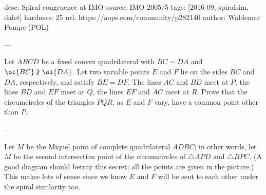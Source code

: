 desc: Spiral congruence at IMO
source: IMO 2005/5
tags: [2016-09, spiralsim, dalet]
hardness: 25
url: https://aops.com/community/p282140
author: Waldemar Pompe (POL)

---

Let $ABCD$ be a fixed convex quadrilateral
with $BC=DA$ and $\ol{BC} \nparallel \ol{DA}$.
Let two variable points $E$ and $F$ lie on the
sides $BC$ and $DA$, respectively, and satisfy $BE=DF$.
The lines $AC$ and $BD$ meet at $P$,
the lines $BD$ and $EF$ meet at $Q$,
the lines $EF$ and $AC$ meet at $R$.
Prove that the circumcircles of the triangles $PQR$,
as $E$ and $F$ vary, have a common point other than $P$.

---

Let $M$ be the Miquel point of complete quadrilateral $ADBC$;
in other words, let $M$ be the second intersection point
of the circumcircles of $\triangle APD$ and $\triangle BPC$.
(A good diagram should betray this secret;
all the points are given in the picture.)
This makes lots of sense since we know $E$ and $F$
will be sent to each other under the spiral similarity too.

